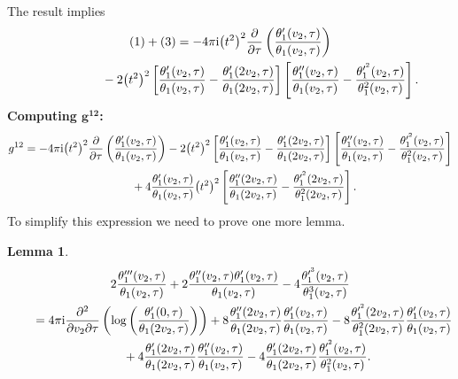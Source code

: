 \documentclass[10pt,a4paper]{amsart}
\numberwithin{equation}{section}
\newtheorem{Lemma}[Theorem]{Lemma}
\begin{document}
The result implies
\begin{gather*}
(1) + (3) =-4\pi {\rm i}\big(t^2\big)^2\frac{\partial}{\partial \tau}\left(\frac{\theta_1^{\prime}(v_2,\tau)}{\theta_1(v_2,\tau)}\right)\\
\hphantom{(1) + (3) =}{}
 - 2\big(t^2\big)^2\left[\frac{\theta_1^{\prime}(v_2,\tau)}{\theta_1(v_2,\tau)} - \frac{\theta_1^{\prime}(2v_2,\tau)}{\theta_1(2v_2,\tau)}\right] \left[\frac{\theta_1^{\prime\prime}(v_2,\tau)}{\theta_1(v_2,\tau)} - \frac{\theta_1^{\prime^2}(v_2,\tau)}{\theta_1^2(v_2,\tau)}\right] .
\end{gather*}
\textbf{Computing $\boldsymbol {g^{12}}$:}
\begin{gather*}
g^{12}=-4\pi {\rm i}\big(t^2\big)^2\frac{\partial}{\partial \tau}\left(\frac{\theta_1^{\prime}(v_2,\tau)}{\theta_1(v_2,\tau)}\right)
-2\big(t^2\big)^2\left[\frac{\theta_1^{\prime}(v_2,\tau)}{\theta_1(v_2,\tau)} -\frac{\theta_1^{\prime}(2v_2,\tau)}{\theta_1(2v_2,\tau)}\right] \left[\frac{\theta_1^{\prime\prime}(v_2,\tau)}{\theta_1(v_2,\tau)} -\frac{\theta_1^{\prime^2}(v_2,\tau)}{\theta_1^2(v_2,\tau)}\right]
\\ \hphantom{g^{12}=}
{}+4\frac{\theta_1^{\prime}(v_2,\tau)}{\theta_1(v_2,\tau)}\big(t^2\big)^2 \left[\frac{\theta_1^{\prime\prime}(2v_2,\tau)}{\theta_1(2v_2,\tau)} -\frac{\theta_1^{\prime^2}(2v_2,\tau)}{\theta_1^2(2v_2,\tau)}\right].
\end{gather*}
To simplify this expression we need to prove one more lemma.

\begin{Lemma}
\begin{gather}
2\frac{\theta_1^{\prime\prime\prime}(v_2,\tau)}{\theta_1(v_2,\tau)} +2\frac{\theta_1^{\prime\prime}(v_2,\tau)\theta_1^{\prime}(v_2,\tau)}{\theta_1(v_2,\tau)} -4\frac{\theta_1^{\prime^3}(v_2,\tau)}{\theta_1^3(v_2,\tau)}\nonumber
\\ \qquad
{}=4\pi {\rm i} \frac{\partial^2}{\partial v_2\partial \tau}\left( \log\left(\frac{\theta_1^{\prime}(0,\tau)}{\theta_1(2v_2,\tau)}\right)\right)
+8\frac{\theta_1^{\prime\prime}(2v_2,\tau)}{\theta_1(2v_2,\tau)} \frac{\theta_1^{\prime}(v_2,\tau)}{\theta_1(v_2,\tau)} -8\frac{\theta_1^{\prime^2}(2v_2,\tau)}{\theta_1^2(2v_2,\tau)} \frac{\theta_1^{\prime}(v_2,\tau)}{\theta_1(v_2,\tau)}\nonumber
\\ \qquad\hphantom{=}
{}+4\frac{\theta_1^{\prime}(2v_2,\tau)}{\theta_1(2v_2,\tau)} \frac{\theta_1^{\prime\prime}(v_2,\tau)}{\theta_1(v_2,\tau)}
-4\frac{\theta_1^{\prime}(2v_2,\tau)}{\theta_1(2v_2,\tau)} \frac{\theta_1^{\prime^2}(v_2,\tau)}{\theta_1^2(v_2,\tau)}.
\label{lemmaa2}
\end{gather}
\end{Lemma}
\end{document}
